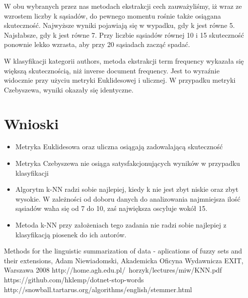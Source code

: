 \documentclass{classrep}
\begin{document}
W obu wybranych przez nas metodach ekstrakcji cech zauważyliśmy, iż wraz ze wzrostem liczby k sąsiadów, do pewnego momentu rośnie także osiągana skuteczność. Najwyższe wyniki pojawiają się w wypadku, gdy k jest równe 5. Najsłabsze, gdy k jest równe 7. Przy liczbie sąsiadów równej 10 i 15 skuteczność ponownie lekko wzrasta, aby przy 20 sąsiadach zacząć spadać.\newline

W klasyfikacji kategorii authors, metoda ekstrakcji term frequency wykazała się większą skutecznością, niż inverse document frequency. Jest to wyraźnie widocznie przy użyciu metryki Euklidesowej i ulicznej. W przypadku metryki Czebyszewa, wyniki okazały się identyczne. 	
	
\section{Wnioski}
\begin{itemize}
	\item Metryka Euklidesowa oraz uliczna osiągają zadowalającą skuteczność
	\item Metryka Czebyszewa nie osiąga satysfakcjonujących wyników w przypadku klasyfikacji
	\item Algorytm k-NN radzi sobie najlepiej, kiedy k nie jest zbyt niskie oraz zbyt wysokie. W zależności od doboru danych do analizowania najmniejsza ilość sąsiadów waha się od 7 do 10, zaś największa oscyluje wokół 15.
	\item Metoda k-NN przy założeniach tego zadania nie radzi sobie najlepiej z klasyfikacją piosenek do ich autorów.
\end{itemize}

	

\begin{thebibliography}{}
Methods for the linguistic summarization of data - aplications of fuzzy sets and their extensions, Adam Niewiadomski, Akademicka Oficyna Wydawnicza EXIT, Warszawa 2008
http://home.agh.edu.pl/~horzyk/lectures/miw/KNN.pdf
https://github.com/hklemp/dotnet-stop-words
http://snowball.tartarus.org/algorithms/english/stemmer.html
\end{thebibliography}
\end{document}

